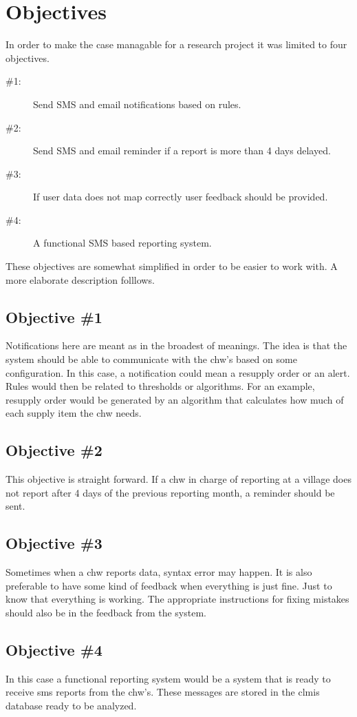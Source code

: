 \section{Objectives}
In order to make the case managable for a research project it was limited to four objectives. 

\begin{description}
\item[\#1:] Send SMS and email notifications based on rules.
\item[\#2:] Send SMS and email reminder if a report is more than 4 days delayed.
\item[\#3:] If user data does not map correctly user feedback should be provided.
\item[\#4:] A functional SMS based reporting system.
\end{description}

These objectives are somewhat simplified in order to be easier to work with. A more elaborate description folllows. 
\subsection{Objective \#1}
Notifications here are meant as in the broadest of meanings. The idea is that the system should be able to communicate with the \gls{chw}'s based on some configuration. In this case, a notification could mean a resupply order or an alert. Rules would then be related to thresholds or algorithms. For an example, resupply order would be generated by an algorithm that calculates how much of each supply item the \gls{chw} needs. 
\subsection{Objective \#2}
This objective is straight forward. If a \gls{chw} in charge of reporting at a village does not report after 4 days of the previous reporting month, a reminder should be sent. 
\subsection{Objective \#3}
Sometimes when a \gls{chw} reports data, syntax error may happen. It is also preferable to have some kind of feedback when everything is just fine. Just to know that everything is working. 
The appropriate instructions for fixing mistakes should also be in the feedback from the system.
\subsection{Objective \#4}
In this case a functional reporting system would be a system that is ready to receive \gls{sms} reports from the \gls{chw}'s. These messages are stored in the \gls{clmis} database ready to be analyzed. 

